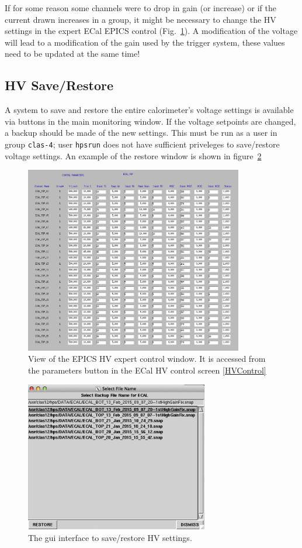 \documentclass[12pt]{article}
\begin{document}
{      If for some reason some channels were to drop in gain (or increase) or if the current drawn increases in a group, it might be necessary to change the HV settings in the expert ECal EPICS control (Fig.~\ref{EHV}). A modification of the voltage will lead to a modification of the gain used by the trigger system, these values need to be updated at the same time!
      \subsection{HV Save/Restore}
      A system to save and restore the entire calorimeter's voltage settings is available via buttons in the main monitoring window.  If the voltage setpoints are changed, a backup should be made of the new settings.  This must be run as a user in group \texttt{clas-4};  user \texttt{hpsrun} does not have sufficient priveleges to save/restore voltage settings. 
      An example of the restore window is shown in figure~\ref{fig:hvrestore}

\begin{figure}[htbp]
\center
\includegraphics[width=0.85\textwidth]{pics/ecalhv_parameters_2014_12_15.png}
\caption{\small \label{EHV} View of the EPICS HV expert control window. It is accessed from the parameters button in the ECal HV control screen \ref{HVControl}}
\end{figure}

\begin{figure}[htbp]\centering
    \includegraphics[width=8cm]{pics/hvrestore.png}
    \caption{The gui interface to save/restore HV settings.  \label{fig:hvrestore}}
\end{figure}

}
\end{document}
